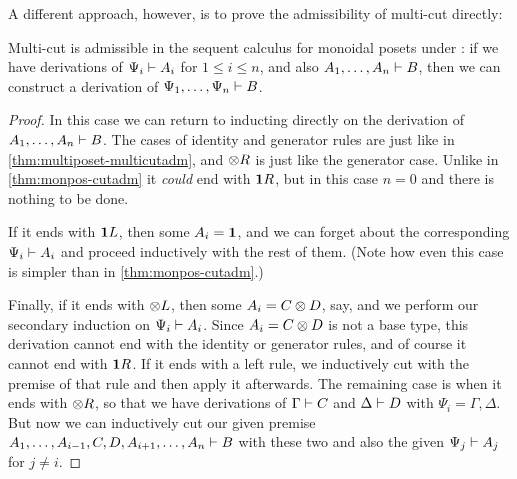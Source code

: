 A different approach, however, is to prove the admissibility of multi-cut directly:

\begin{thm}\label{thm:monpos-multicutadm}
  Multi-cut is admissible in the sequent calculus for monoidal posets under \cG: if we have derivations of $\Psi_i\vdash A_i$ for $1\le i\le n$, and also $A_1,\dots,A_n \vdash B$, then we can construct a derivation of $\Psi_1,\dots,\Psi_n\vdash B$.
\end{thm}
\begin{proof}
  In this case we can return to inducting directly on the derivation of $A_1,\dots,A_n \vdash B$.
  The cases of identity and generator rules are just like in \cref{thm:multiposet-multicutadm}, and $\mathord{\otimes}R$ is just like the generator case.
  Unlike in \cref{thm:monpos-cutadm} it \emph{could} end with $\mathbf{1} R$, but in this case $n=0$ and there is nothing to be done.

  If it ends with $\mathbf{1} L$, then some $A_i = \mathbf{1}$, and we can forget about the corresponding $\Psi_i\vdash A_i$ and proceed inductively with the rest of them.
  (Note how even this case is simpler than in \cref{thm:monpos-cutadm}.)

  Finally, if it ends with $\mathord{\otimes}L$, then some $A_i = C\otimes D$, say, and we perform our secondary induction on $\Psi_i\vdash A_i$.
  Since $A_i=C\otimes D$ is not a base type, this derivation cannot end with the identity or generator rules, and of course it cannot end with $\mathbf{1} R$.
  If it ends with a left rule, we inductively cut with the premise of that rule and then apply it afterwards.
  The remaining case is when it ends with $\mathord{\otimes}R$, so that we have derivations of $\Gamma\vdash C$ and $\Delta\vdash D$ with $\Psi_i = \Gamma,\Delta$.
  But now we can inductively cut our given premise $A_1,\dots,A_{i-1},C,D,A_{i+1},\dots,A_n \vdash B$ with these two and also the given $\Psi_j\vdash A_j$ for $j\neq i$.
\end{proof}

